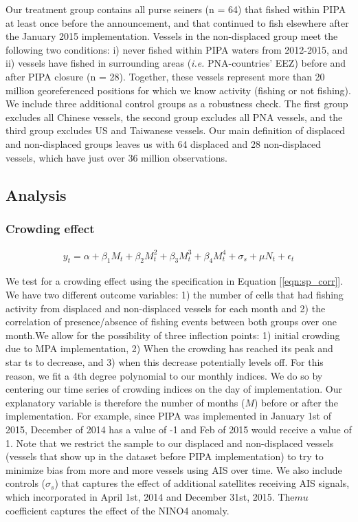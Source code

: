 \documentclass[9p,twocolumn,twoside,lineno]{pnas-new}
\begin{document}
\begin{scriptsize}
Our treatment group contains all purse seiners (n = 64) that fished within PIPA at least once before the announcement, and that continued to fish elsewhere after the January 2015 implementation. Vessels in the non-displaced group meet the following two conditions: i) never fished within PIPA waters from 2012-2015, and ii) vessels have fished in surrounding areas (\emph{i.e.} PNA-countries' EEZ) before and after PIPA closure (n = 28). Together, these vessels represent more than 20 million georeferenced positions for which we know activity (fishing or not fishing). We include three additional control groups as a robustness check. The first group excludes all Chinese vessels, the second group excludes all PNA vessels, and the third group excludes US and Taiwanese vessels. Our main definition of displaced and non-displaced groups leaves us with 64 displaced and 28 non-displaced vessels, which have just over 36 million observations.

\subsection{Analysis}

\subsubsection{Crowding effect}

\begin{figure}[H]
	\begin{align}
	y_t = \alpha + \beta_1 M_t + \beta_2 M_t^2 + \beta_3 M_t^3 + \beta_4 M_t ^4 + \sigma_s + \mu N_t + \epsilon_t
	\label{eqn:sp_corr}
	\end{align}
\end{figure}

We test for a crowding effect using the specification in Equation [\ref{eqn:sp_corr}]. We have two different outcome variables:
1) the number of cells that had fishing activity from displaced and non-displaced vessels for each month and 2) the correlation of presence/absence of fishing events between both groups over one month.We allow for the possibility of three inflection points: 1) initial crowding due to MPA implementation, 2) When the crowding has reached its peak and star  ts to decrease, and 3) when this decrease potentially levels off. For this reason, we fit a 4th degree polynomial to our monthly indices. We do so by centering our time series of crowding indices on the day of implementation. Our explanatory variable is therefore the number of months ($M$) before or after the implementation. For example, since PIPA was implemented in January 1st of 2015, December of 2014 has a value of -1 and Feb of 2015 would receive a value of 1. Note that we restrict the sample to our displaced and non-displaced vessels (vessels that show up in the dataset before PIPA implementation) to try to minimize bias from more and more vessels using AIS over time. We also include controls ($\sigma_s$) that captures the effect of additional satellites receiving AIS signals, which incorporated in April 1st, 2014 and December 31st, 2015. The$mu$ coefficient captures the effect of the NINO4 anomaly.


\end{scriptsize}
\end{document}
